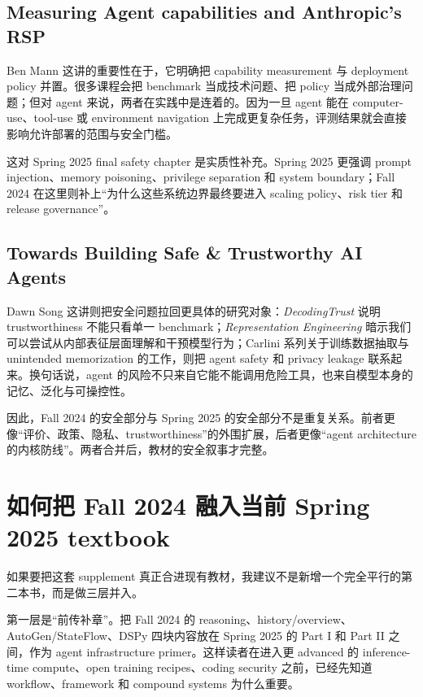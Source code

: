 \subsection{Measuring Agent capabilities and Anthropic’s RSP}

Ben Mann 这讲的重要性在于，它明确把 capability measurement 与 deployment policy 并置。很多课程会把 benchmark 当成技术问题、把 policy 当成外部治理问题；但对 agent 来说，两者在实践中是连着的。因为一旦 agent 能在 computer-use、tool-use 或 environment navigation 上完成更复杂任务，评测结果就会直接影响允许部署的范围与安全门槛。

这对 Spring 2025 final safety chapter 是实质性补充。Spring 2025 更强调 prompt injection、memory poisoning、privilege separation 和 system boundary；Fall 2024 在这里则补上“为什么这些系统边界最终要进入 scaling policy、risk tier 和 release governance”。

\subsection{Towards Building Safe \& Trustworthy AI Agents}

Dawn Song 这讲则把安全问题拉回更具体的研究对象：\textit{DecodingTrust} 说明 trustworthiness 不能只看单一 benchmark；\textit{Representation Engineering} 暗示我们可以尝试从内部表征层面理解和干预模型行为；Carlini 系列关于训练数据抽取与 unintended memorization 的工作，则把 agent safety 和 privacy leakage 联系起来。换句话说，agent 的风险不只来自它能不能调用危险工具，也来自模型本身的记忆、泛化与可操控性。

因此，Fall 2024 的安全部分与 Spring 2025 的安全部分不是重复关系。前者更像“评价、政策、隐私、trustworthiness”的外围扩展，后者更像“agent architecture 的内核防线”。两者合并后，教材的安全叙事才完整。

\section{如何把 Fall 2024 融入当前 Spring 2025 textbook}

如果要把这套 supplement 真正合进现有教材，我建议不是新增一个完全平行的第二本书，而是做三层并入。

第一层是“前传补章”。把 Fall 2024 的 reasoning、history/overview、AutoGen/StateFlow、DSPy 四块内容放在 Spring 2025 的 Part I 和 Part II 之间，作为 agent infrastructure primer。这样读者在进入更 advanced 的 inference-time compute、open training recipes、coding security 之前，已经先知道 workflow、framework 和 compound systems 为什么重要。

